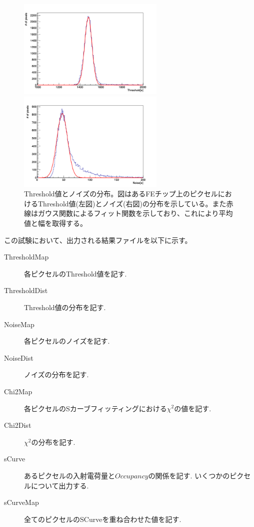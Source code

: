 \begin{figure}[bpt]\centering
  \begin{minipage}{0.45\hsize}
    \includegraphics[width=7cm]{./data/analysis_result/Threshold_mean_dist.png}
  \end{minipage}
  \begin{minipage}{0.45\hsize}
    \includegraphics[width=7cm]{./data/analysis_result/Threshold_noise_dist.png}
  \end{minipage}
  \caption[Threshold値とノイズの分布。]{Threshold値とノイズの分布。図はあるFEチップ上のピクセルにおけるThreshold値(左図)とノイズ(右図)の分布を示している。また赤線はガウス関数によるフィット関数を示しており、これにより平均値と幅を取得する。}
  \label{threshold_mean_sigma}
\end{figure}

この試験において、出力される結果ファイルを以下に示す。
\begin{description}
  \item [ThresholdMap] 各ピクセルのThreshold値を記す.
  \item [ThresholdDist] Threshold値の分布を記す.
  \item [NoiseMap] 各ピクセルのノイズを記す.
  \item [NoiseDist] ノイズの分布を記す. 
  \item [Chi2Map] 各ピクセルのSカーブフィッティングにおける$\chi^2$の値を記す.
  \item [Chi2Dist] $\chi^2$の分布を記す.
  \item [sCurve] あるピクセルの入射電荷量と$Occupancy$の関係を記す. いくつかのピクセルについて出力する.
  \item [sCurveMap] 全てのピクセルのSCurveを重ね合わせた値を記す.
\end{description}

